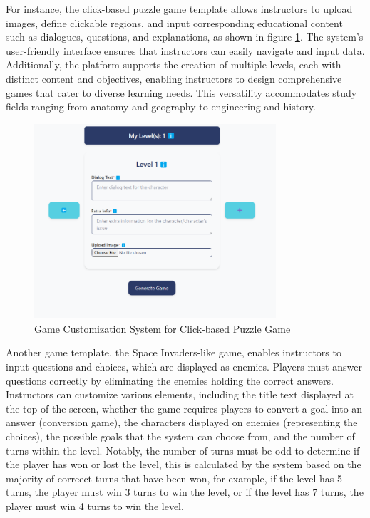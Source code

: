 For instance, the click-based puzzle game template allows instructors to upload images, define clickable regions, and input corresponding educational content such as dialogues, questions, and explanations, as shown in figure \ref{fig:customizationClickPuzzle}. The system’s user-friendly interface ensures that instructors can easily navigate and input data. Additionally, the platform supports the creation of multiple levels, each with distinct content and objectives, enabling instructors to design comprehensive games that cater to diverse learning needs. This versatility accommodates study fields ranging from anatomy and geography to engineering and history. 

\begin{figure}
	\centering
	\includegraphics[width=0.8\textwidth]{figures/Diagnose_Game/Instructor_Portal_Diagnose_Gam_olde.png}
	\caption{Game Customization System for Click-based Puzzle Game}
	\label{fig:customizationClickPuzzle}
\end{figure}

Another game template, the Space Invaders-like game, enables instructors to input questions and choices, which are displayed as enemies. Players must answer questions correctly by eliminating the enemies holding the correct answers. Instructors can customize various elements, including the title text displayed at the top of the screen, whether the game requires players to convert a goal into an answer (conversion game), the characters displayed on enemies (representing the choices), the possible goals that the system can choose from, and the number of turns within the level. Notably, the number of turns must be odd to determine if the player has won or lost the level, this is calculated by the system based on the majority of correect turns that have been won, for example, if the level has 5 turns, the player must win 3 turns to win the level, or if the level has 7 turns, the player must win 4 turns to win the level.

